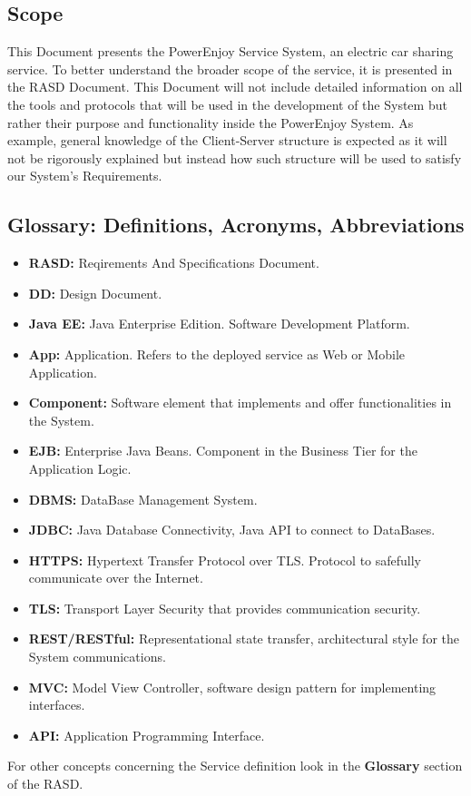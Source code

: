 \documentclass[a4paper]{article}
\begin{document}
\subsection{Scope}
This Document presents the PowerEnjoy Service System, an electric car sharing service. To better understand the broader scope of the service, it is presented in the RASD Document. This Document will not include detailed information on all the tools and protocols that will be used in the development of the System but rather their purpose and functionality inside the PowerEnjoy System. As example, general knowledge of the Client-Server structure is expected as it will not be rigorously explained but instead how such structure will be used to satisfy our System's Requirements. 

\subsection{Glossary: Definitions, Acronyms, Abbreviations}
\begin{itemize}
\item \textbf{RASD:} Reqirements And Specifications Document.
\item \textbf{DD:} Design Document.
\item \textbf{Java EE:} Java Enterprise Edition. Software Development Platform.
\item \textbf{App:} Application. Refers to the deployed service as Web or Mobile Application.
\item \textbf{Component:} Software element that implements and offer functionalities in the System.
\item \textbf{EJB:} Enterprise Java Beans. Component in the Business Tier for the Application Logic.
\item \textbf{DBMS:} DataBase Management System.
\item \textbf{JDBC:} Java Database Connectivity, Java API to connect to DataBases.
\item \textbf{HTTPS:} Hypertext Transfer Protocol over TLS. Protocol to safefully communicate over the Internet.
\item \textbf{TLS:} Transport Layer Security that provides communication security.
\item \textbf{REST/RESTful:} Representational state transfer, architectural style for the System communications.
\item \textbf{MVC:} Model View Controller, software design pattern for implementing interfaces.
\item \textbf{API:} Application Programming Interface.
\end{itemize}
For other concepts concerning the Service definition look in the \textbf{Glossary} section of the RASD.
\end{document}

